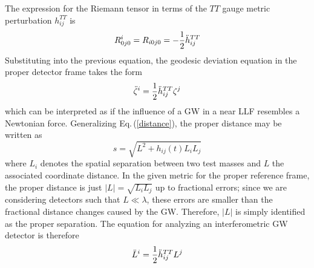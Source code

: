\documentclass[binding=0.6cm, LaM]{sapthesis}
\begin{document}
        The expression for the Riemann tensor in terms of the $TT$ gauge metric perturbation $h_{ij}^{TT}$ is
        \begin{equation}
          R^i_{0j0} = R_{i0j0} = - {1 \over 2}{\ddot h}_{ij}^{TT}
        \end{equation}
        Substituting into the previous equation, the geodesic deviation equation in the proper detector frame takes the form
        \begin{equation}
          {\ddot \zeta}^i = {1 \over 2}{\ddot h}_{ij}^{TT}\zeta^j
        \end{equation}
        which can be interpreted as if the influence of a GW in a near LLF resembles a Newtonian force.
        Generalizing Eq.\,(\ref{distance}), the proper distance may be written as
        \begin{equation}
          s = \sqrt{L^2 + h_{ij}(t)L_{i}L_{j}}
        \end{equation}
        where $L_i$ denotes the spatial separation between two test masses and $L$ the associated coordinate distance.
        In the given metric for the proper reference frame, the proper distance is just $|L| = \sqrt{L_iL_j}$ up to fractional errors;
        since we are considering detectors such that
        $L \ll \lambda$, these errors are smaller than the fractional distance changes caused by the GW.
        Therefore, $|L|$ is simply identified as the proper separation. The equation for analyzing an interferometric GW detector is therefore
        \begin{equation}
          {\ddot L}^i = {1 \over 2}{\ddot h}_{ij}^{TT}L^j
        \end{equation}
\end{document}
